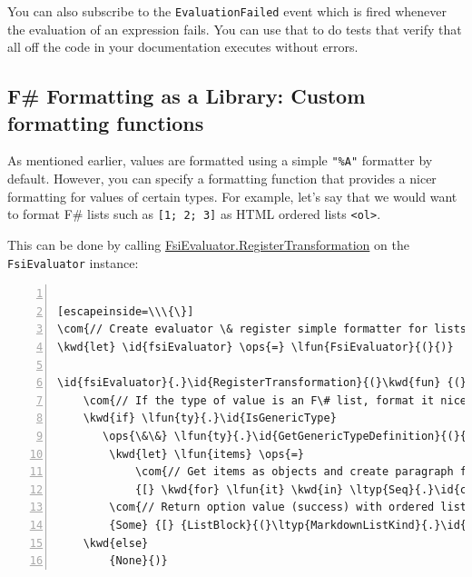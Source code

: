 \documentclass{article}
\newcommand{\id}[1]{\textcolor{black}{#1}}
\newcommand{\com}[1]{\textcolor{officegreen}{#1}}
\newcommand{\kwd}[1]{\textcolor{navy}{#1}}
\newcommand{\ops}[1]{\textcolor{purple}{#1}}
\begin{document}
You can also subscribe to the \texttt{EvaluationFailed} event which is fired whenever the evaluation
of an expression fails. You can use that to do tests that verify that all off the code in your
documentation executes without errors.
\subsection*{F\# Formatting as a Library: Custom formatting functions}



As mentioned earlier, values are formatted using a simple \texttt{"\%A"} formatter by default.
However, you can specify a formatting function that provides a nicer formatting for values
of certain types. For example, let's say that we would want to format F\# lists such as
\texttt{[1; 2; 3]} as HTML ordered lists \texttt{<ol>}.


This can be done by calling \href{https://fsprojects.github.io/FSharp.Formatting/reference/fsharp-formatting-literate-evaluation-fsievaluator.html\#RegisterTransformation}{FsiEvaluator.RegisterTransformation} on the \texttt{FsiEvaluator} instance:
\begin{lstlisting}[numbers=left]

[escapeinside=\\\{\}]
\com{// Create evaluator \& register simple formatter for lists}
\kwd{let} \id{fsiEvaluator} \ops{=} \lfun{FsiEvaluator}{(}{)}

\id{fsiEvaluator}{.}\id{RegisterTransformation}{(}\kwd{fun} {(}\lfun{o}{,} \lfun{ty}{,} \id{\_executionCount}{)} \kwd{->}
    \com{// If the type of value is an F\# list, format it nicely}
    \kwd{if} \lfun{ty}{.}\id{IsGenericType}
       \ops{\&\&} \lfun{ty}{.}\id{GetGenericTypeDefinition}{(}{)} \ops{=} \kwd{typedefof}{<}\ltyp{list}{<}\id{\_}{>}{>} \kwd{then}
        \kwd{let} \lfun{items} \ops{=}
            \com{// Get items as objects and create paragraph for each item}
            {[} \kwd{for} \lfun{it} \kwd{in} \ltyp{Seq}{.}\id{cast}{<}\ltyp{obj}{>} {(}\lfun{unbox} \lfun{o}{)} \kwd{->} {[} {Paragraph}{(}{[} {Literal}{(}\lfun{it}{.}\id{ToString}{(}{)}{,} {None}{)} {]}{,} {None}{)} {]} {]}
        \com{// Return option value (success) with ordered list}
        {Some} {[} {ListBlock}{(}\ltyp{MarkdownListKind}{.}\id{Ordered}{,} \lfun{items}{,} {None}{)} {]}
    \kwd{else}
        {None}{)}

\end{lstlisting}
\end{document}
